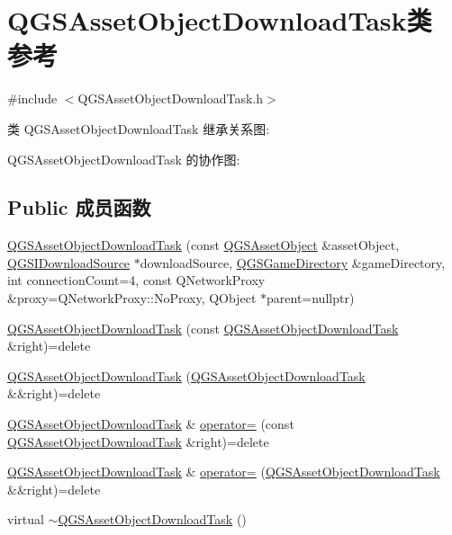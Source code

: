 \hypertarget{class_q_g_s_asset_object_download_task}{}\section{Q\+G\+S\+Asset\+Object\+Download\+Task类 参考}
\label{class_q_g_s_asset_object_download_task}


{\ttfamily \#include $<$Q\+G\+S\+Asset\+Object\+Download\+Task.\+h$>$}



类 Q\+G\+S\+Asset\+Object\+Download\+Task 继承关系图\+:


Q\+G\+S\+Asset\+Object\+Download\+Task 的协作图\+:
\subsection*{Public 成员函数}
\begin{DoxyCompactItemize}
\item 
\mbox{\hyperlink{class_q_g_s_asset_object_download_task_a6d7e516c482448d5b70254cdf012c29f}{Q\+G\+S\+Asset\+Object\+Download\+Task}} (const \mbox{\hyperlink{class_q_g_s_asset_object}{Q\+G\+S\+Asset\+Object}} \&asset\+Object, \mbox{\hyperlink{class_q_g_s_i_download_source}{Q\+G\+S\+I\+Download\+Source}} $\ast$download\+Source, \mbox{\hyperlink{class_q_g_s_game_directory}{Q\+G\+S\+Game\+Directory}} \&game\+Directory, int connection\+Count=4, const Q\+Network\+Proxy \&proxy=Q\+Network\+Proxy\+::\+No\+Proxy, Q\+Object $\ast$parent=nullptr)
\item 
\mbox{\hyperlink{class_q_g_s_asset_object_download_task_a34ad91cbd4b6a1dee5099fc3cb3adf52}{Q\+G\+S\+Asset\+Object\+Download\+Task}} (const \mbox{\hyperlink{class_q_g_s_asset_object_download_task}{Q\+G\+S\+Asset\+Object\+Download\+Task}} \&right)=delete
\item 
\mbox{\hyperlink{class_q_g_s_asset_object_download_task_a047f564acd989125faab61d0f32721e2}{Q\+G\+S\+Asset\+Object\+Download\+Task}} (\mbox{\hyperlink{class_q_g_s_asset_object_download_task}{Q\+G\+S\+Asset\+Object\+Download\+Task}} \&\&right)=delete
\item 
\mbox{\hyperlink{class_q_g_s_asset_object_download_task}{Q\+G\+S\+Asset\+Object\+Download\+Task}} \& \mbox{\hyperlink{class_q_g_s_asset_object_download_task_a896258ffe3045325e0a555a6a38ba152}{operator=}} (const \mbox{\hyperlink{class_q_g_s_asset_object_download_task}{Q\+G\+S\+Asset\+Object\+Download\+Task}} \&right)=delete
\item 
\mbox{\hyperlink{class_q_g_s_asset_object_download_task}{Q\+G\+S\+Asset\+Object\+Download\+Task}} \& \mbox{\hyperlink{class_q_g_s_asset_object_download_task_ab30e44abe05e3cb318c9358ede955441}{operator=}} (\mbox{\hyperlink{class_q_g_s_asset_object_download_task}{Q\+G\+S\+Asset\+Object\+Download\+Task}} \&\&right)=delete
\item 
virtual \mbox{\hyperlink{class_q_g_s_asset_object_download_task_a2f8bbd4bb3afcf0b2e9c0aa6c06fdf06}{$\sim$\+Q\+G\+S\+Asset\+Object\+Download\+Task}} ()
\end{DoxyCompactItemize}
